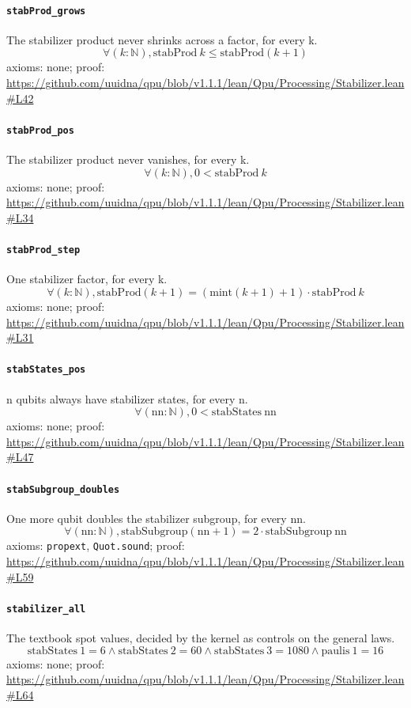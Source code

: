 \documentclass[11pt]{article}
\begin{document}
\paragraph{\texttt{stabProd\_grows}}
The stabilizer product never shrinks across a factor, for every k.
\[ \forall (k : \mathbb{N}), \mathrm{stabProd}\ k \le \mathrm{stabProd} (k + 1) \]
\noindent axioms: none; proof: \url{https://github.com/uuidna/qpu/blob/v1.1.1/lean/Qpu/Processing/Stabilizer.lean\#L42}

\paragraph{\texttt{stabProd\_pos}}
The stabilizer product never vanishes, for every k.
\[ \forall (k : \mathbb{N}), 0 < \mathrm{stabProd}\ k \]
\noindent axioms: none; proof: \url{https://github.com/uuidna/qpu/blob/v1.1.1/lean/Qpu/Processing/Stabilizer.lean\#L34}

\paragraph{\texttt{stabProd\_step}}
One stabilizer factor, for every k.
\[ \forall (k : \mathbb{N}), \mathrm{stabProd} (k + 1) = (\mathrm{mint} (k + 1) + 1) \cdot \mathrm{stabProd}\ k \]
\noindent axioms: none; proof: \url{https://github.com/uuidna/qpu/blob/v1.1.1/lean/Qpu/Processing/Stabilizer.lean\#L31}

\paragraph{\texttt{stabStates\_pos}}
n qubits always have stabilizer states, for every n.
\[ \forall (\mathrm{nn} : \mathbb{N}), 0 < \mathrm{stabStates}\ \mathrm{nn} \]
\noindent axioms: none; proof: \url{https://github.com/uuidna/qpu/blob/v1.1.1/lean/Qpu/Processing/Stabilizer.lean\#L47}

\paragraph{\texttt{stabSubgroup\_doubles}}
One more qubit doubles the stabilizer subgroup, for every nn.
\[ \forall (\mathrm{nn} : \mathbb{N}), \mathrm{stabSubgroup} (\mathrm{nn} + 1) = 2 \cdot \mathrm{stabSubgroup}\ \mathrm{nn} \]
\noindent axioms: \texttt{propext}, \texttt{Quot.sound}; proof: \url{https://github.com/uuidna/qpu/blob/v1.1.1/lean/Qpu/Processing/Stabilizer.lean\#L59}

\paragraph{\texttt{stabilizer\_all}}
The textbook spot values, decided by the kernel as controls on the general laws.
\[ \mathrm{stabStates}\ 1 = 6 \land \mathrm{stabStates}\ 2 = 60 \land \mathrm{stabStates}\ 3 = 1080 \land \mathrm{paulis}\ 1 = 16 \]
\noindent axioms: none; proof: \url{https://github.com/uuidna/qpu/blob/v1.1.1/lean/Qpu/Processing/Stabilizer.lean\#L64}
\end{document}
